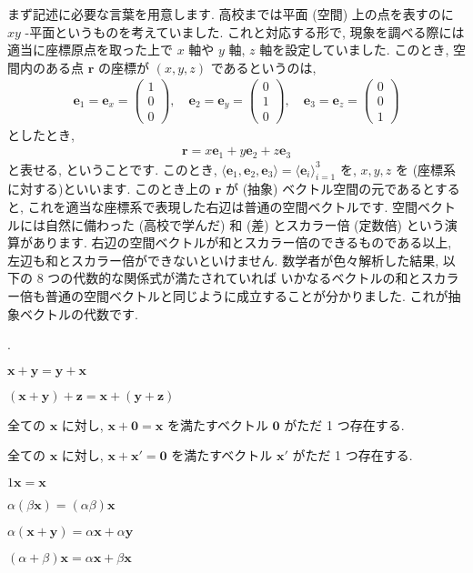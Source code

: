\documentclass[openany, a4paper, oneside]{jsbook}
\newcounter{enum2}
\renewenvironment{enumerate}{%
\begin{list}%
{%
\arabic{enum2}.\ \,%
}%
{%
\usecounter{enum2}
\setlength{\itemindent}{0pt}%
\setlength{\leftmargin}{15pt}%
\setlength{\rightmargin}{0pt}%
\setlength{\labelsep}{0pt}%
\setlength{\labelwidth}{6pt}%
\setlength{\itemsep}{0pt}%
\setlength{\parsep}{0pt}%
\setlength{\listparindent}{0pt}%
}
}{%
\end{list}%
}
\theoremstyle{break}
\theoremstyle{breakdefn}
\begin{document}
まず記述に必要な言葉を用意します.
高校までは平面 (空間) 上の点を表すのに $x y$ -平面というものを考えていました.
これと対応する形で, 現象を調べる際には適当に座標原点を取った上で $x$ 軸や $y$ 軸,  $z$ 軸を設定していました.
このとき, 空間内のある点 $\bm{r}$ の座標が $(x,y,z)$ であるというのは,
    \begin{align}
        \bm{e}_1
        =
        \bm{e}_x
        =
        \begin{pmatrix}
            1 \\ 0 \\ 0
        \end{pmatrix},
        \quad
        \bm{e}_2
        =
        \bm{e}_y
        =
        \begin{pmatrix}
            0 \\ 1 \\ 0
        \end{pmatrix},
        \quad
        \bm{e}_3
        =
        \bm{e}_z
        =
        \begin{pmatrix}
            0 \\ 0 \\ 1
        \end{pmatrix}
    \end{align}
としたとき,
    \begin{align}
        \bm{r}
        =
        x \bm{e}_1 + y \bm{e}_2 + z \bm{e}_3
    \end{align}
と表せる, ということです.
このとき,
$\langle \bm{e}_1 , \bm{e}_2, \bm{e}_3 \rangle = \langle \bm{e}_i \rangle _{i=1}^3$
を, $x,y,z$ を (座標系に対する)といいます.
このとき上の $\bm{r}$ が (抽象) ベクトル空間の元であるとすると,
これを適当な座標系で表現した右辺は普通の空間ベクトルです.
空間ベクトルには自然に備わった (高校で学んだ) 和 (差) とスカラー倍 (定数倍) という演算があります.
右辺の空間ベクトルが和とスカラー倍のできるものである以上, 左辺も和とスカラー倍ができないといけません.
数学者が色々解析した結果, 以下の 8 つの代数的な関係式が満たされていれば
いかなるベクトルの和とスカラー倍も普通の空間ベクトルと同じように成立することが分かりました.
これが抽象ベクトルの代数です.
\begin{enumerate}
\item  $\bm{x} + \bm{y} = \bm{y} + \bm{x}$
\item  $(\bm{x} + \bm{y} ) + \bm{z} = \bm{x} + ( \bm{y} + \bm{z})$
\item 全ての $\bm{x}$ に対し,  $\bm{x} + \bm{0} = \bm{x}$ を満たすベクトル $\bm{0}$ がただ 1 つ存在する.
\item 全ての $\bm{x}$ に対し,  $\bm{x} + \bm{x}' = \bm{0}$ を満たすベクトル $\bm{x}'$ がただ 1 つ存在する.
\item  $1\bm{x} = \bm{x}$
\item  $\alpha (\beta \bm{x}) = (\alpha \beta) \bm{x}$
\item  $\alpha (\bm{x} + \bm{y} ) = \alpha \bm{x} + \alpha \bm{y}$
\item  $(\alpha + \beta ) \bm{x} = \alpha \bm{x} + \beta \bm{x}$
\end{enumerate}
\end{document}
